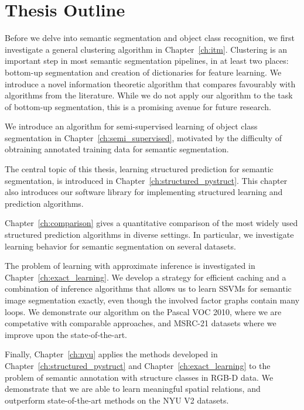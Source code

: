 \section{Thesis Outline}
Before we delve into semantic segmentation and object class recognition, we
first investigate a general clustering algorithm in Chapter~\ref{ch:itm}.
Clustering is an important step in most semantic segmentation pipelines, in at
least two places: bottom-up segmentation and creation of dictionaries for
feature learning. We introduce a novel information theoretic algorithm that
compares favourably with algorithms from the literature.  While we do not apply
our algorithm to the task of bottom-up segmentation, this is a promising avenue
for future research.

We introduce an algorithm for semi-supervised learning of object class
segmentation in Chapter~\ref{ch:semi_supervised}, motivated by the difficulty of
obtraining annotated training data for semantic segmentation.

The central topic of this thesis, learning structured prediction for semantic
segmentation, is introduced in Chapter~\ref{ch:structured_pystruct}. This
chapter also introduces our software library for implementing structured
learning and prediction algorithms.

Chapter~\ref{ch:comparison} gives a quantitative comparison of the most widely
used structured prediction algorithms in diverse settings.
In particular, we investigate learning behavior for
semantic segmentation on several datasets.

The problem of learning with approximate inference is investigated in
Chapter~\ref{ch:exact_learning}.  We develop a strategy for efficient caching
and a combination of inference algorithms that allows us to learn SSVMs for
semantic image segmentation exactly, even though the involved factor graphs
contain many loops. We demonstrate our algorithm on the Pascal VOC 2010, where we are competative
with comparable approaches, and MSRC-21 datasets where we improve upon the state-of-the-art.

Finally, Chapter~\ref{ch:nyu} applies the methods developed in
Chapter~\ref{ch:structured_pystruct} and Chapter~\ref{ch:exact_learning} to the
problem of semantic annotation with structure classes in RGB-D data. We
demonstrate that we are able to learn meaningful spatial relations, and outperform
state-of-the-art methods on the NYU V2 datasets.

